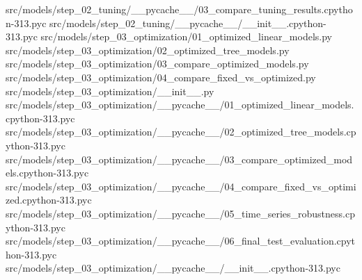 \documentclass[
  11pt,
  a4paper]{article}
\newenvironment{Shaded}{}{}
\newcommand{\NormalTok}[1]{#1}
\begin{document}
\begin{Shaded}
\begin{Highlighting}[]
\NormalTok{src/models/step\_\allowbreak{}02\_\allowbreak{}tuning/\_\allowbreak{}\_\allowbreak{}pycache\_\allowbreak{}\_\allowbreak{}/03\_\allowbreak{}compare\_\allowbreak{}tuning\_\allowbreak{}results.cpython{-}313.pyc}
\NormalTok{src/models/step\_\allowbreak{}02\_\allowbreak{}tuning/\_\allowbreak{}\_\allowbreak{}pycache\_\allowbreak{}\_\allowbreak{}/\_\allowbreak{}\_\allowbreak{}init\_\allowbreak{}\_\allowbreak{}.cpython{-}313.pyc}
\NormalTok{src/models/step\_\allowbreak{}03\_\allowbreak{}optimization/01\_\allowbreak{}optimized\_\allowbreak{}linear\_\allowbreak{}models.py}
\NormalTok{src/models/step\_\allowbreak{}03\_\allowbreak{}optimization/02\_\allowbreak{}optimized\_\allowbreak{}tree\_\allowbreak{}models.py}
\NormalTok{src/models/step\_\allowbreak{}03\_\allowbreak{}optimization/03\_\allowbreak{}compare\_\allowbreak{}optimized\_\allowbreak{}models.py}
\NormalTok{src/models/step\_\allowbreak{}03\_\allowbreak{}optimization/04\_\allowbreak{}compare\_\allowbreak{}fixed\_\allowbreak{}vs\_\allowbreak{}optimized.py}
\NormalTok{src/models/step\_\allowbreak{}03\_\allowbreak{}optimization/\_\allowbreak{}\_\allowbreak{}init\_\allowbreak{}\_\allowbreak{}.py}
\NormalTok{src/models/step\_\allowbreak{}03\_\allowbreak{}optimization/\_\allowbreak{}\_\allowbreak{}pycache\_\allowbreak{}\_\allowbreak{}/01\_\allowbreak{}optimized\_\allowbreak{}linear\_\allowbreak{}models.cpython{-}313.pyc}
\NormalTok{src/models/step\_\allowbreak{}03\_\allowbreak{}optimization/\_\allowbreak{}\_\allowbreak{}pycache\_\allowbreak{}\_\allowbreak{}/02\_\allowbreak{}optimized\_\allowbreak{}tree\_\allowbreak{}models.cpython{-}313.pyc}
\NormalTok{src/models/step\_\allowbreak{}03\_\allowbreak{}optimization/\_\allowbreak{}\_\allowbreak{}pycache\_\allowbreak{}\_\allowbreak{}/03\_\allowbreak{}compare\_\allowbreak{}optimized\_\allowbreak{}models.cpython{-}313.pyc}
\NormalTok{src/models/step\_\allowbreak{}03\_\allowbreak{}optimization/\_\allowbreak{}\_\allowbreak{}pycache\_\allowbreak{}\_\allowbreak{}/04\_\allowbreak{}compare\_\allowbreak{}fixed\_\allowbreak{}vs\_\allowbreak{}optimized.cpython{-}313.pyc}
\NormalTok{src/models/step\_\allowbreak{}03\_\allowbreak{}optimization/\_\allowbreak{}\_\allowbreak{}pycache\_\allowbreak{}\_\allowbreak{}/05\_\allowbreak{}time\_\allowbreak{}series\_\allowbreak{}robustness.cpython{-}313.pyc}
\NormalTok{src/models/step\_\allowbreak{}03\_\allowbreak{}optimization/\_\allowbreak{}\_\allowbreak{}pycache\_\allowbreak{}\_\allowbreak{}/06\_\allowbreak{}final\_\allowbreak{}test\_\allowbreak{}evaluation.cpython{-}313.pyc}
\NormalTok{src/models/step\_\allowbreak{}03\_\allowbreak{}optimization/\_\allowbreak{}\_\allowbreak{}pycache\_\allowbreak{}\_\allowbreak{}/\_\allowbreak{}\_\allowbreak{}init\_\allowbreak{}\_\allowbreak{}.cpython{-}313.pyc}

\end{Highlighting}
\end{Shaded}
\end{document}

